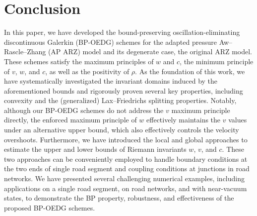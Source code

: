 \documentclass[times,final]{elsarticle}
\numberwithin{equation}{section}
\theoremstyle{definition}
\theoremstyle{remark}
\begin{document}
\section{Conclusion}
In this paper, we have developed the bound-preserving oscillation-eliminating discontinuous Galerkin (BP-OEDG) schemes for the adapted pressure Aw--Rascle--Zhang (AP ARZ) model and its degenerate case, the original ARZ model. These schemes satisfy the maximum principles of \( w \) and \( c \), the minimum principle of \( v \), \(w\), and \(c\), as well as the positivity of \( \rho \). 
%
As the foundation of this work, we have systematically investigated the invariant domains induced by the aforementioned bounds and rigorously proven several key properties, including convexity and the (generalized) Lax--Friedrichs splitting properties. 
%
Notably, although our BP-OEDG schemes do not address the \( v \) maximum principle directly, the enforced maximum principle of \( w \) effectively maintains the \( v \) values under an alternative upper bound, which also effectively controls the velocity overshoots.
%
Furthermore, we have introduced the local and global approaches to estimate the upper and lower bounds of Riemann invariants $w$, $v$, and $c$. These two approaches can be conveniently employed to handle boundary conditions at the two ends of single road segment and coupling conditions at junctions in road networks.
%  
We have presented several challenging numerical examples, including applications on a single road segment, on road networks, and with near-vacuum states, to demonstrate the BP property, robustness, and effectiveness of the proposed BP-OEDG schemes.




%

\end{document}
